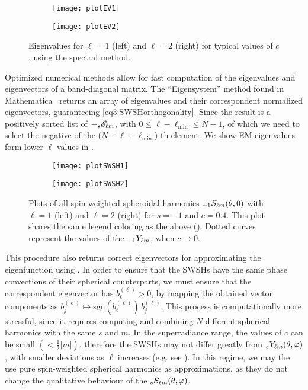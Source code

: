 \begin{figure}[h]
	\centering
	\vspace{0.2cm}
	\begin{subfigure}[c]{0.49\textwidth}
        \texttt{[image: plotEV1]}
	\end{subfigure}
	\hfill
	\begin{subfigure}[c]{0.48\textwidth}
		\texttt{[image: plotEV2]}
	\end{subfigure}
	\hfill
	\caption{Eigenvalues for $\ell=1$ (left) and $\ell=2$ (right) for typical values of $c$, using the spectral method.}
	\label{fig4:plotsEV12}
\end{figure}
Optimized numerical methods allow for fast computation of the eigenvalues and eigenvectors of a band-diagonal matrix.
The ``Eigensystem'' method found in Mathematica\texttrademark~ returns an array of eigenvalues and their correspondent normalized eigenvectors, guaranteeing \eqref{eq3:SWSHorthogonality}. Since the result is a positively sorted list of $-\uu[s]{\mathscr{E}}{\ell m}$, with $0\le \ell-\ell_\mathrm{min}\le N-1$, of which we need to select the negative of the ($N-\ell+\ell_\mathrm{min}$)-th element.
We show EM eigenvalues form lower $\ell$ values in .
\begin{figure}[!b]
	\centering
	\vspace{0.2cm}
	\begin{subfigure}[c]{0.49\textwidth}
        \texttt{[image: plotSWSH1]}
	\end{subfigure}
	\hfill
	\begin{subfigure}[c]{0.49\textwidth}
		\texttt{[image: plotSWSH2]}
	\end{subfigure}
	\hfill
	\caption{Plots of all spin-weighted spheroidal harmonics $\uu[-1]{S}{\ell m}(\theta,0)$ with $\ell=1$ (left) and $\ell=2$ (right) for $s=-1$ and $c=0.4$. This plot shares the same legend coloring as the above (). Dotted curves represent the values of the $\uu[-1]{Y}{\ell m}$, when $c\to0$.}
	\label{fig4:plotSWSH12}
\end{figure}
This procedure also returns correct eigenvectors for approximating the eigenfunction using .
In order to ensure that the SWSHs have the same phase convections of their spherical counterparts, we must ensure that the correspondent eigenvector has $b_\ell^{(\ell)}>0$, by mapping the obtained vector components as $b_j^{(\ell)}\mapsto \mathrm{sgn}(b_\ell^{(\ell)}) \,b_j^{(\ell)}$.
This process is computationally more stressful, since it requires computing and combining $N$ different spherical harmonics with the same $s$ and $m$.
In the superradiance range, the values of $c$ can be small $\left(<\tfrac{1}{2}|m|\right)$, therefore the SWSHs may not differ greatly from $\uu[s]{Y}{\ell m}(\theta,\varphi)$, with smaller deviations as $\ell$ increases (e.g. see ).
In this regime, we may the use pure spin-weighted spherical harmonics as approximations, as they do not change the qualitative behaviour of the $\uu[s]{S}{\ell m}(\theta,\varphi)$.


